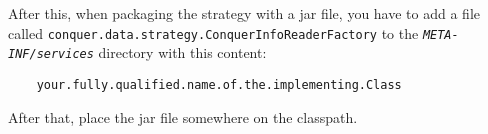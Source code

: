 \documentclass{article}
\begin{document}
    After this, when packaging the strategy with a jar file, you have to add a file called \newline \texttt{conquer.data.strategy.ConquerInfoReaderFactory} to the \texttt{\textit{META-INF/services}} directory with this content:
    \begin{verbatim}
	your.fully.qualified.name.of.the.implementing.Class
    \end{verbatim}
    After that, place the jar file somewhere on the classpath.
\end{document}
